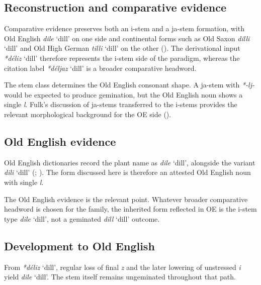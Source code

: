 \documentclass[
  british,
  a4paper,
  openany]{book}
\providecommand{\Recon}[1]{\emph{*#1}}
{\catcode`→=\active \global\def→{\ensuremath{\rightarrow}}}
\providecommand{\Recon}[1]{\emph{*#1}}
{\catcode`→=\active \global\def→{\ensuremath{\rightarrow}}}
\begin{document}
\subsection{Reconstruction and comparative
evidence}\label{reconstruction-and-comparative-evidence-78}

Comparative evidence preserves both an i-stem and a ja-stem formation,
with Old English {\emph{dile}} `dill' on one side and continental forms
such as Old Saxon {\emph{dilli}} `dill' and Old High German
{\emph{tilli}} `dill' on the other (). The derivational input {\Recon{déliz} `dill'} therefore
represents the i-stem side of the paradigm, whereas the citation label
{\Recon{déljaz} `dill'} is a broader comparative headword.

The stem class determines the Old English consonant shape. A ja-stem
with \emph{*-lj-} would be expected to produce gemination, but the Old
English noun shows a single \emph{l}. Fulk's discussion of ja-stems
transferred to the i-stems provides the relevant morphological
background for the OE side ().

\subsection{Old English evidence}\label{old-english-evidence-78}

Old English dictionaries record the plant name as {\emph{dile}} `dill',
alongside the variant {\emph{dili}} `dill'
(;
). The form discussed
here is therefore an attested Old English noun with single \emph{l}.

The Old English evidence is the relevant point. Whatever broader
comparative headword is chosen for the family, the inherited form
reflected in OE is the i-stem type {\emph{dile}} `dill', not a geminated
{\emph{dill}} `dill' outcome.

\subsection{Development to Old
English}\label{development-to-old-english-78}

From {\Recon{déliz} `dill'}, regular loss of final \emph{z} and the
later lowering of unstressed \emph{i} yield {\emph{dile}} `dill'. The
stem itself remains ungeminated throughout that path.
\end{document}
